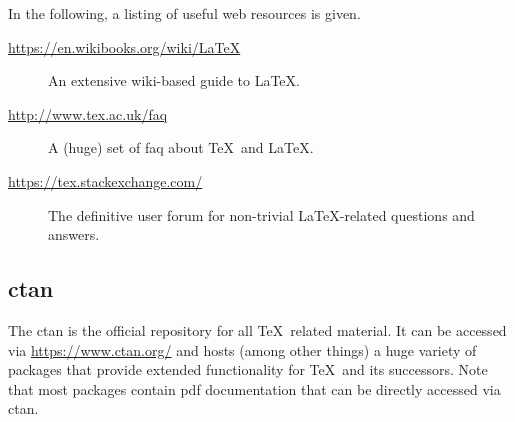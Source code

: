 In the following, a listing of useful web resources is given.
\begin{description}
\item[\url{https://en.wikibooks.org/wiki/LaTeX}] An extensive wiki-based guide to \LaTeX.
\item[\url{http://www.tex.ac.uk/faq}] A (huge) set of \gls{faq} about \TeX\ and \LaTeX.
\item[\url{https://tex.stackexchange.com/}] The definitive user forum for non-trivial \LaTeX-related questions and answers.
\end{description}

\subsection[Comprehensive TeX Archive Network]{\gls{ctan}}

The \gls{ctan} is the official repository for all \TeX\ related material.
It can be accessed via \url{https://www.ctan.org/} and hosts (among other things) a huge variety of packages that provide extended functionality for \TeX\ and its successors.
Note that most packages contain \gls{pdf} documentation that can be directly accessed via \gls{ctan}.

